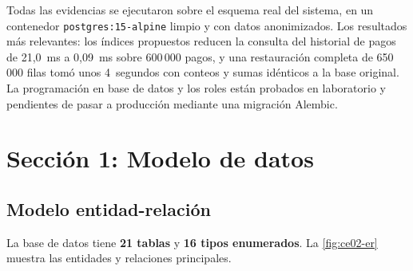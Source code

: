 Todas las evidencias se ejecutaron sobre el esquema real del sistema, en un contenedor
\texttt{postgres:15-alpine} limpio y con datos anonimizados. Los resultados más
relevantes: los índices propuestos reducen la consulta del historial de pagos de
21,0~ms a 0,09~ms sobre 600\,000 pagos, y una restauración completa de 650\,000 filas
tomó unos 4~segundos con conteos y sumas idénticos a la base original. La programación
en base de datos y los roles están probados en laboratorio y pendientes de pasar a
producción mediante una migración Alembic.

\section{Sección 1: Modelo de datos}
\label{sec:ce02-modelo}

\subsection{Modelo entidad-relación}
\label{sec:ce02-er}

La base de datos tiene \textbf{21 tablas} y \textbf{16 tipos enumerados}. La
\cref{fig:ce02-er} muestra las entidades y relaciones principales.


